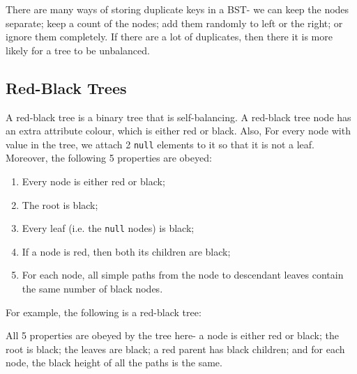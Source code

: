 \documentclass[a4paper, openany]{memoir}
\begin{document}
\noindent There are many ways of storing duplicate keys in a BST- we can keep the nodes separate; keep a count of the nodes; add them randomly to left or the right; or ignore them completely. If there are a lot of duplicates, then there it is more likely for a tree to be unbalanced.

\subsection{Red-Black Trees}
A red-black tree is a binary tree that is self-balancing. A red-black tree node has an extra attribute colour, which is either red or black. Also, For every node with value in the tree, we attach 2 \texttt{null} elements to it so that it is not a leaf. Moreover, the following 5 properties are obeyed:
\begin{enumerate}
    \item Every node is either red or black;
    \item The root is black;
    \item Every leaf (i.e. the \texttt{null} nodes) is black;
    \item If a node is red, then both its children are black;
    \item For each node, all simple paths from the node to descendant leaves contain the same number of black nodes.
\end{enumerate}
For example, the following is a red-black tree:
\begin{center}
\end{center}
All 5 properties are obeyed by the tree here- a node is either red or black; the root is black; the leaves are black; a red parent has black children; and for each node, the black height of all the paths is the same.
\end{document}
